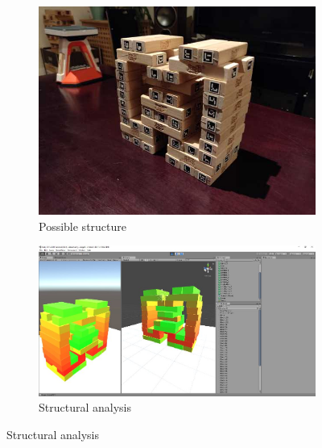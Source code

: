 \begin{figure}[ht]
    \hspace*{\fill}
    \begin{subfigure}{0.3\textwidth}
    \includegraphics[width=\linewidth]{images/testing/structure-real.jpg}
    \caption{Possible structure} \label{fig:structure}
    \end{subfigure}
    \hspace*{\fill}
    \begin{subfigure}{0.5\textwidth}
    \includegraphics[width=\linewidth]{images/testing/structure.jpg}
    \caption{Structural analysis} \label{fig:structureanalysis}
    \end{subfigure}
    \hspace*{\fill}
\end{figure}
